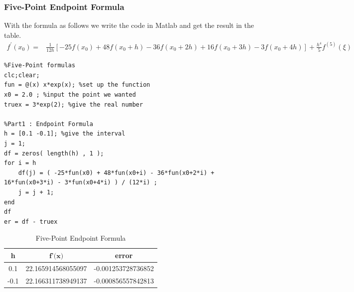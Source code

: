 \documentclass{article}
\begin{document}
\subsubsection{Five-Point Endpoint Formula}
With the formula as follows we write the code in Matlab and get the result in the table.
\begin{align}
f^{\prime}\left(x_{0}\right)=& \frac{1}{12 h}\left[-25 f\left(x_{0}\right)+48 f\left(x_{0}+h\right)-36 f\left(x_{0}+2 h\right)+16 f\left(x_{0}+3 h\right)-3 f\left(x_{0}+4 h\right)\right]+\frac{h^{4}}{5} f^{(5)}(\xi)\nonumber
\end{align}
\begin{lstlisting}
%Five-Point formulas
clc;clear;
fun = @(x) x*exp(x); %set up the function
x0 = 2.0 ; %input the point we wanted
truex = 3*exp(2); %give the real number

%Part1 : Endpoint Formula
h = [0.1 -0.1]; %give the interval
j = 1;
df = zeros( length(h) , 1 );
for i = h
    df(j) = ( -25*fun(x0) + 48*fun(x0+i) - 36*fun(x0+2*i) + 16*fun(x0+3*i) - 3*fun(x0+4*i) ) / (12*i) ; 
    j = j + 1;
end
df
er = df - truex
\end{lstlisting}
\begin{table}[!ht]
    \centering
    \begin{tabular}{|c|c|c|}
    \hline
        \textbf{h} & $\textbf{f'(x)}$ & \textbf{error} \\ \hline
        0.1 &   22.165914568055097  &   -0.001253728736852  \\ \hline
        -0.1 &   22.166311738949137  &   -0.000856557842813  \\ \hline
    \end{tabular}
    \caption{Five-Point Endpoint Formula}
    \label{5PE}
\end{table}
\end{document}
